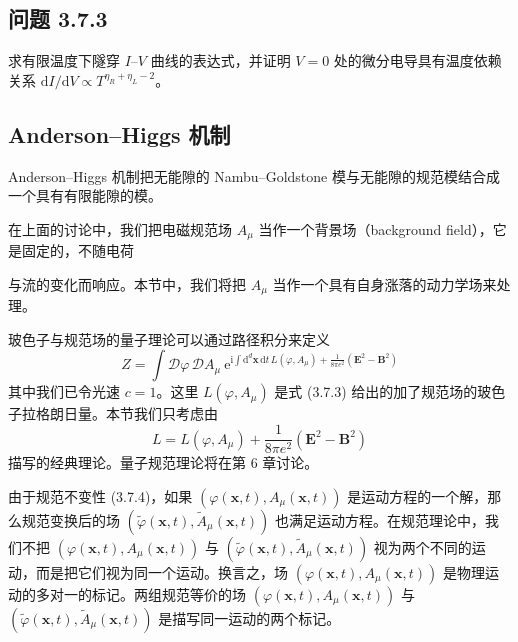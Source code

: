 \subsection*{问题 3.7.3}
求有限温度下隧穿 $I$--$V$ 曲线的表达式，并证明 $V=0$ 处的微分电导具有温度依赖关系 $\mathrm{d}I/\mathrm{d}V\propto T^{\eta_{R}+\eta_{L}-2}$。

\subsection{Anderson--Higgs 机制}
\begin{keypoints}
\item Anderson--Higgs 机制把无能隙的 Nambu--Goldstone 模与无能隙的规范模结合成一个具有有限能隙的模。
\end{keypoints}

在上面的讨论中，我们把电磁规范场 $A_{\mu}$ 当作一个背景场（background field），它是固定的，不随电荷

与流的变化而响应。本节中，我们将把 $A_{\mu}$ 当作一个具有自身涨落的动力学场来处理。

玻色子与规范场的量子理论可以通过路径积分来定义
\begin{equation*}
Z = \int\mathcal{D}\varphi\,\mathcal{D}A_{\mu}\ \mathrm{e}^{\mathrm{i}\int \mathrm{d}^{d}\pmb{x}\,\mathrm{d}t\, L(\varphi,A_{\mu}) + \frac{1}{8\pi e^{2}}(\pmb{E}^{2}-\pmb{B}^{2})}
\end{equation*}
其中我们已令光速 $c=1$。这里 $L(\varphi,A_{\mu})$ 是式 (3.7.3) 给出的加了规范场的玻色子拉格朗日量。本节我们只考虑由
\begin{equation*}
L = L(\varphi,A_{\mu}) + \frac{1}{8\pi e^{2}}(\pmb{E}^{2}-\pmb{B}^{2}) \tag{3.7.16}
\end{equation*}
描写的经典理论。量子规范理论将在第 6 章讨论。

由于规范不变性 (3.7.4)，如果 $(\varphi(\pmb{x},t), A_{\mu}(\pmb{x},t))$ 是运动方程的一个解，那么规范变换后的场 $(\tilde{\varphi}(\pmb{x},t), \tilde{A}_{\mu}(\pmb{x},t))$ 也满足运动方程。在规范理论中，我们不把 $(\varphi(\pmb{x},t), A_{\mu}(\pmb{x},t))$ 与 $(\tilde{\varphi}(\pmb{x},t), \tilde{A}_{\mu}(\pmb{x},t))$ 视为两个不同的运动，而是把它们视为同一个运动。换言之，场 $(\varphi(\pmb{x},t), A_{\mu}(\pmb{x},t))$ 是物理运动的多对一的标记。两组规范等价的场 $(\varphi(\pmb{x},t), A_{\mu}(\pmb{x},t))$ 与 $(\tilde{\varphi}(\pmb{x},t), \tilde{A}_{\mu}(\pmb{x},t))$ 是描写同一运动的两个标记。

